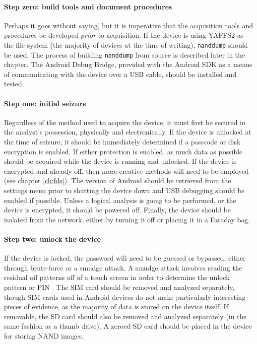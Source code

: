 \paragraph{Step zero: build tools and document procedures}
Perhaps it goes without saying, but it is imperative that the acquisition tools and procedures be developed \emph{prior} to
acquisition.  If the device is using YAFFS2 as the file system (the majority of devices at the time of writing), \texttt{nanddump}
should  be used.  The process of building \texttt{nanddump} from source is described later in the chapter.  The Android Debug
Bridge, provided with the Android SDK as a means of communicating with the device over a USB cable, should be installed and tested. 

\paragraph{Step one: initial seizure}
Regardless of the method used to acquire the device, it must first be secured in the analyst's possession, physically and
electronically.  If the device is unlocked at the time of seizure, it should be immediately determined if a passcode or disk
encryption is enabled. If either protection is enabled, as much data as possible should be acquired while the device is running and
unlocked.  If the device is encrypted and already off, then more creative methods will need to be employed (see chapter
\ref{ch:fde}).  The version of Android should be retrieved from the settings menu prior to shutting the device down and USB
debugging should be enabled if possible.  Unless a logical analysis is going to be performed, or the device is encrypted, it should
be powered off.  Finally, the device should be isolated from the network, either by turning it off or placing it in a Faraday bag.

\paragraph{Step two: unlock the device}
If the device is locked, the password will need to be guessed or bypassed, either through brute-force or a smudge attack.  A smudge
attack involves reading the residual oil patterns off of a touch screen in order to determine the unlock pattern or PIN
\cite{smudge}. The SIM card should be removed and analyzed separately, though SIM cards used in Android devices do not make
particularly interesting pieces of evidence, as the majority of data is stored on the device itself.  If removable, the SD card
should also be removed and analyzed separately (in the same fashion as a thumb drive). A zeroed SD card should be placed in the
device for storing NAND images. 
 
